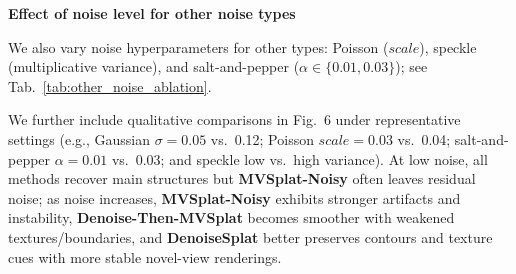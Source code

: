 \noindent \textbf{Effect of noise level for other noise types}
\label{subsubsec:ablation_other_level}

We also vary noise hyperparameters for other types: Poisson ($scale$), speckle (multiplicative variance), and salt-and-pepper (\(\alpha \in \{0.01, 0.03\}\)); see Tab.~\ref{tab:other_noise_ablation}.




We further include qualitative comparisons in Fig.~6 under representative settings (e.g., Gaussian \(\sigma=0.05\) vs.\ 0.12; Poisson $scale=0.03$ vs.\ 0.04; salt-and-pepper \(\alpha=0.01\) vs.\ 0.03; and speckle low vs.\ high variance).
At low noise, all methods recover main structures but \textbf{MVSplat-Noisy} often leaves residual noise; as noise increases, \textbf{MVSplat-Noisy} exhibits stronger artifacts and instability, \textbf{Denoise-Then-MVSplat} becomes smoother with weakened textures/boundaries, and \textbf{DenoiseSplat} better preserves contours and texture cues with more stable novel-view renderings.

